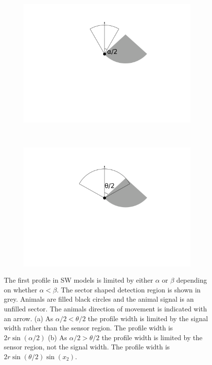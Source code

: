 \begin{figure}[t]
        \centering
        \begin{subfigure}[t]{0.35\textwidth}
                \centering
        \includegraphics[width=1\textwidth, trim=7cm 10cm 6cm 1cm]{imgs/forward.pdf}
                \caption{}
                \label{f:SWforward} %
        \end{subfigure}
~ 
        \begin{subfigure}[t]{0.35\textwidth}
                \centering
        \includegraphics[width=1\textwidth, trim=7cm 10cm 6cm 1cm]{imgs/forward2.pdf}
                \caption{}
                \label{f:SWforwad2}
        \end{subfigure}

\caption[The first profile in SW models]{The first profile in SW models is limited by either $\alpha$ or $\beta$ depending on whether $\alpha < \beta$.  The sector shaped detection region is shown in grey. Animals are filled black circles and the animal signal is an unfilled sector. The animals direction of movement is indicated with an arrow. (a)  As $\alpha/2 < \theta/2$ the profile width is limited by the signal width rather than the sensor region. The profile width is $2r\sin\left(\alpha/2\right)$ (b) As $\alpha/2 > \theta/2$ the profile width is limited by the sensor region, not the signal width. The profile width is $2r\sin\left(\theta/2\right)\sin(x_2)$.    }
\label{f:forward}
\end{figure}


